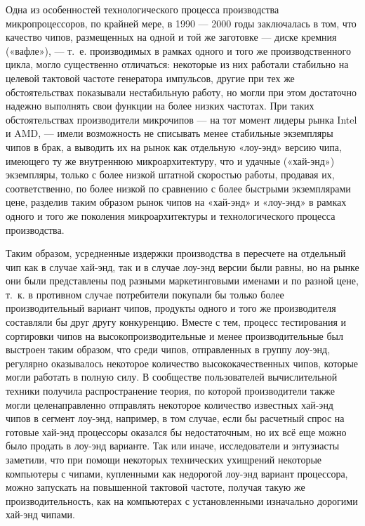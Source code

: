 \documentclass{article}
\begin{document}
Одна из особенностей технологического процесса производства микропроцессоров, по крайней мере, в 1990 — 2000 годы заключалась в том, что качество чипов, размещенных на одной и той же заготовке — диске кремния («вафле»), — т.~е. производимых в рамках одного и того же производственного цикла, могло существенно отличаться: некоторые из них работали стабильно на целевой тактовой частоте генератора импульсов, другие при тех же обстоятельствах показывали нестабильную работу, но могли при этом достаточно надежно выполнять свои функции на более низких частотах. При таких обстоятельствах производители микрочипов — на тот момент лидеры рынка Intel и AMD, — имели возможность не списывать менее стабильные экземпляры чипов в брак, а выводить их на рынок как отдельную «лоу-энд» версию чипа, имеющего ту же внутреннюю микроархитектуру, что и удачные («хай-энд») экземпляры, только с более низкой штатной скоростью работы, продавая их, соответственно, по более низкой по сравнению с более быстрыми экземплярами цене, разделив таким образом рынок чипов на «хай-энд» и «лоу-энд» в рамках одного и того же поколения микроархитектуры и технологического процесса производства.

Таким образом, усредненные издержки производства в пересчете на отдельный чип как в случае хай-энд, так и в случае лоу-энд версии были равны, но на рынке они были представлены под разными маркетинговыми именами и по разной цене, т.~к. в противном случае потребители покупали бы только более производительный вариант чипов, продукты одного и того же производителя составляли бы друг другу конкуренцию. Вместе с тем, процесс тестирования и сортировки чипов на высокопроизводительные и менее производительные был выстроен таким образом, что среди чипов, отправленных в группу лоу-энд, регулярно оказывалось некоторое количество высококачественных чипов, которые могли работать в полную силу. В сообществе пользователей вычислительной техники получила распространение теория, по которой производители также могли целенаправленно отправлять некоторое количество известных хай-энд чипов в сегмент лоу-энд, например, в том случае, если бы расчетный спрос на готовые хай-энд процессоры оказался бы недостаточным, но их всё еще можно было продать в лоу-энд варианте. Так или иначе, исследователи и энтузиасты заметили, что при помощи некоторых технических ухищрений некоторые компьютеры с чипами, купленными как недорогой лоу-энд вариант процессора, можно запускать на повышенной тактовой частоте, получая такую же производительность, как на компьютерах с установленными изначально дорогими хай-энд чипами.
\end{document}
